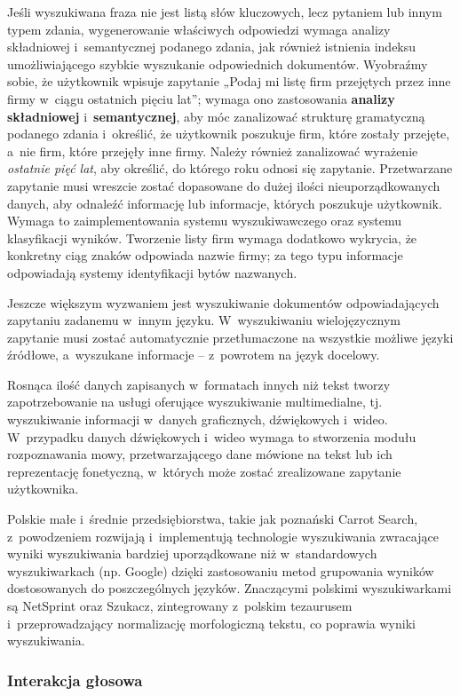 \begin{multicols}{2}
Jeśli wyszukiwana fraza nie jest listą słów kluczowych, lecz
pytaniem lub innym typem zdania, wygenerowanie właściwych odpowiedzi
wymaga analizy składniowej i~semantycznej podanego zdania, jak
również istnienia indeksu umożliwiającego szybkie wyszukanie
odpowiednich dokumentów. Wyobraźmy sobie, że użytkownik wpisuje
zapytanie „Podaj mi listę firm przejętych przez inne firmy
w~ciągu ostatnich pięciu lat”; wymaga ono zastosowania
\textbf{analizy składniowej} i~\textbf{semantycznej}, aby móc
zanalizować strukturę gramatyczną podanego zdania i~określić, że
użytkownik poszukuje firm, które zostały przejęte, a~nie firm,
które przejęły inne firmy. Należy również zanalizować
wyrażenie \emph{ostatnie pięć lat}, aby określić, do którego
roku odnosi się zapytanie. Przetwarzane zapytanie musi wreszcie
zostać dopasowane do dużej ilości nieuporządkowanych danych, aby
odnaleźć informację lub informacje, których poszukuje użytkownik.
Wymaga to zaimplementowania systemu wyszukiwawczego oraz systemu
klasyfikacji wyników. Tworzenie listy firm wymaga dodatkowo wykrycia,
że konkretny ciąg znaków odpowiada nazwie firmy; za tego typu
informacje odpowiadają systemy identyfikacji bytów nazwanych. 

Jeszcze większym wyzwaniem jest wyszukiwanie dokumentów
odpowiadających zapytaniu zadanemu w~innym języku. W~wyszukiwaniu
wielojęzycznym zapytanie musi zostać automatycznie przetłumaczone
na wszystkie możliwe języki źródłowe, a~wyszukane informacje –
z~powrotem na język docelowy. 

Rosnąca ilość danych zapisanych w~formatach innych niż tekst
tworzy zapotrzebowanie na usługi oferujące wyszukiwanie
multimedialne, tj. wyszukiwanie informacji w~danych graficznych,
dźwiękowych i~wideo. W~przypadku danych dźwiękowych i~wideo wymaga
to stworzenia modułu rozpoznawania mowy, przetwarzającego dane
mówione na tekst lub ich reprezentację fonetyczną, w~których może
zostać zrealizowane zapytanie użytkownika. 

Polskie małe i~średnie przedsiębiorstwa, takie jak poznański
Carrot Search, z~powodzeniem rozwijają i~implementują technologie
wyszukiwania zwracające wyniki wyszukiwania bardziej uporządkowane
niż w~standardowych wyszukiwarkach (np. Google) dzięki zastosowaniu
metod grupowania wyników dostosowanych do poszczególnych języków.
Znaczącymi polskimi wyszukiwarkami są NetSprint oraz Szukacz,
zintegrowany z~polskim tezaurusem i~przeprowadzający normalizację
morfologiczną tekstu, co poprawia wyniki wyszukiwania. 

\subsubsection[Interakcja głosowa]{Interakcja głosowa} 


\end{multicols}
